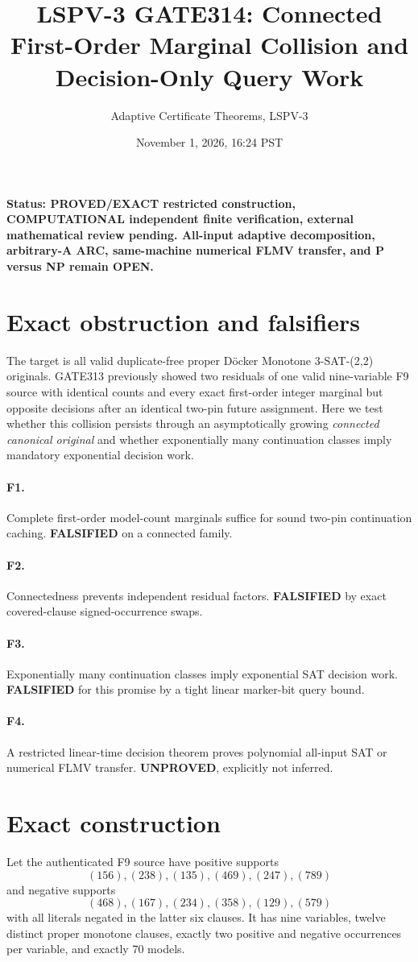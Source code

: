 \documentclass[11pt]{article}
\title{LSPV-3 GATE314: Connected First-Order Marginal Collision and Decision-Only Query Work}
\author{Adaptive Certificate Theorems, LSPV-3}
\date{November 1, 2026, 16:24 PST}
\begin{document}
\maketitle
\noindent\textbf{Status: PROVED/EXACT restricted construction, COMPUTATIONAL independent finite verification, external mathematical review pending. All-input adaptive decomposition, arbitrary-A ARC, same-machine numerical FLMV transfer, and P versus NP remain OPEN.}

\section{Exact obstruction and falsifiers}
The target is all valid duplicate-free proper D\"ocker Monotone 3-SAT-(2,2) originals. GATE313 previously showed two residuals of one valid nine-variable F9 source with identical counts and every exact first-order integer marginal but opposite decisions after an identical two-pin future assignment. Here we test whether this collision persists through an asymptotically growing \emph{connected canonical original} and whether exponentially many continuation classes imply mandatory exponential decision work.

\paragraph{F1.} Complete first-order model-count marginals suffice for sound two-pin continuation caching. \textbf{FALSIFIED} on a connected family.
\paragraph{F2.} Connectedness prevents independent residual factors. \textbf{FALSIFIED} by exact covered-clause signed-occurrence swaps.
\paragraph{F3.} Exponentially many continuation classes imply exponential SAT decision work. \textbf{FALSIFIED} for this promise by a tight linear marker-bit query bound.
\paragraph{F4.} A restricted linear-time decision theorem proves polynomial all-input SAT or numerical FLMV transfer. \textbf{UNPROVED}, explicitly not inferred.

\section{Exact construction}
Let the authenticated F9 source have positive supports
\[
(156),(238),(135),(469),(247),(789)
\]
and negative supports
\[
(468),(167),(234),(358),(129),(579)
\]
with all literals negated in the latter six clauses. It has nine variables, twelve distinct proper monotone clauses, exactly two positive and negative occurrences per variable, and exactly 70 models.
\end{document}

